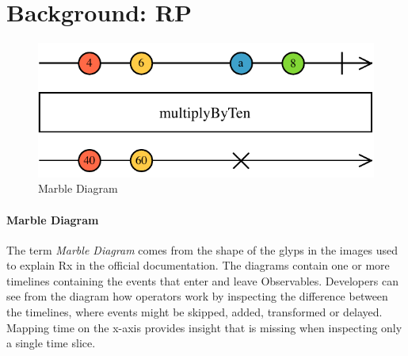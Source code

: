 \section{Background: RP}

\label{background}


\begin{figure}[t]
\centering
\includegraphics[width=\columnwidth]{images/marble-diagram.pdf}
\caption{Marble Diagram}
\label{marblediagram-image}
\end{figure}

\paragraph{Marble Diagram}
\label{marblediagram}
The term \textit{Marble Diagram} comes from the shape of the glyps in the images used to explain Rx in the official documentation. 
The diagrams contain one or more timelines containing the events that enter and leave Observables. 
Developers can see from the diagram how operators work by inspecting the difference between the timelines, 
where events might be skipped, added, transformed or delayed. 
Mapping time on the x-axis provides insight that is missing when inspecting only a single time slice.

